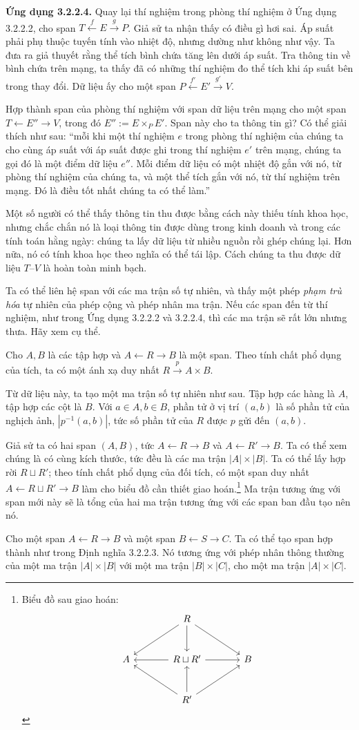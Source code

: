 \noindent\textbf{Ứng dụng 3.2.2.4.} Quay lại thí nghiệm trong phòng thí nghiệm ở Ứng dụng 3.2.2.2, cho span $T\xleftarrow{f}E\xrightarrow{g}P$. Giả sử ta nhận thấy có điều gì hơi sai. Áp suất phải phụ thuộc tuyến tính vào nhiệt độ, nhưng dường như không như vậy. Ta đưa ra giả thuyết rằng thể tích bình chứa tăng lên dưới áp suất. Tra thông tin về bình chứa trên mạng, ta thấy đã có những thí nghiệm đo thể tích khi áp suất bên trong thay đổi. Dữ liệu ấy cho một span $P\xleftarrow{f'}E'\xrightarrow{g'}V$.

Hợp thành span của phòng thí nghiệm với span dữ liệu trên mạng cho một span $T\leftarrow E''\to V$, trong đó $E'':=E\times_PE'$. Span này cho ta thông tin gì? Có thể giải thích như sau: ``mỗi khi một thí nghiệm $e$ trong phòng thí nghiệm của chúng ta cho cùng áp suất với áp suất được ghi trong thí nghiệm $e'$ trên mạng, chúng ta gọi đó là một điểm dữ liệu $e''$. Mỗi điểm dữ liệu có một nhiệt độ gắn với nó, từ phòng thí nghiệm của chúng ta, và một thể tích gắn với nó, từ thí nghiệm trên mạng. Đó là điều tốt nhất chúng ta có thể làm.''

Một số người có thể thấy thông tin thu được bằng cách này thiếu tính khoa học, nhưng chắc chắn nó là loại thông tin được dùng trong kinh doanh và trong các tính toán hằng ngày: chúng ta lấy dữ liệu từ nhiều nguồn rồi ghép chúng lại. Hơn nữa, nó có tính khoa học theo nghĩa có thể tái lập. Cách chúng ta thu được dữ liệu $T$--$V$ là hoàn toàn minh bạch.

Ta có thể liên hệ span với các ma trận số tự nhiên, và thấy một phép \emph{phạm trù hóa} tự nhiên của phép cộng và phép nhân ma trận. Nếu các span đến từ thí nghiệm, như trong Ứng dụng 3.2.2.2 và 3.2.2.4, thì các ma trận sẽ rất lớn nhưng thưa. Hãy xem cụ thể.

Cho $A,B$ là các tập hợp và $A\leftarrow R\to B$ là một span. Theo tính chất phổ dụng của tích, ta có một ánh xạ duy nhất $R\xrightarrow{p}A\times B$.

Từ dữ liệu này, ta tạo một ma trận số tự nhiên như sau. Tập hợp các hàng là $A$, tập hợp các cột là $B$. Với $a\in A,b\in B$, phần tử ở vị trí $(a,b)$ là số phần tử của nghịch ảnh, $|p^{-1}(a,b)|$, tức số phần tử của $R$ được $p$ gửi đến $(a,b)$.

Giả sử ta có hai span $(A,B)$, tức $A\leftarrow R\to B$ và $A\leftarrow R'\to B$. Ta có thể xem chúng là có cùng kích thước, tức đều là các ma trận $|A|\times|B|$. Ta có thể lấy hợp rời $R\sqcup R'$; theo tính chất phổ dụng của đối tích, có một span duy nhất $A\leftarrow R\sqcup R'\to B$ làm cho biểu đồ cần thiết giao hoán.\footnote{Biểu đồ sau giao hoán:
\[\begin{tikzcd}[ampersand replacement=\&,column sep=large,row sep=large]
\&R\arrow[dl]\arrow[d]\arrow[dr]\&\\ A\&R\sqcup R'\arrow[l]\arrow[r]\&B\\
\&R'\arrow[ul]\arrow[u]\arrow[ur]\&\end{tikzcd}\]}
Ma trận tương ứng với span mới này sẽ là tổng của hai ma trận tương ứng với các span ban đầu tạo nên nó.

Cho một span $A\leftarrow R\to B$ và một span $B\leftarrow S\to C$. Ta có thể tạo span hợp thành như trong Định nghĩa 3.2.2.3. Nó tương ứng với phép nhân thông thường của một ma trận $|A|\times|B|$ với một ma trận $|B|\times|C|$, cho một ma trận $|A|\times|C|$.
